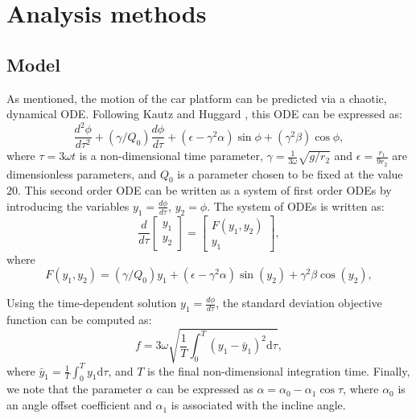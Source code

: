 \documentclass[11pt]{article}
\begin{document}
\section{Analysis methods}

\subsection{Model}

As mentioned, the motion of the car platform can be
predicted via a chaotic, dynamical ODE. Following
Kautz and Huggard \cite{chaos}, this ODE can be
expressed as:
%
\begin{equation}
\frac{d^2 \phi}{d \tau^2} +
(\gamma / Q_0) \frac{d \phi} {d \tau} +
(\epsilon - \gamma^2 \alpha) \sin \phi +
(\gamma^2 \beta) \cos \phi,
\end{equation}
%
where $\tau = 3 \omega t$ is a non-dimensional time
parameter, $\gamma = \frac{1}{3 \omega} \sqrt{g/r_2}$
and $\epsilon = \frac{r_1}{9 r_2}$ are dimensionless
parameters, and $Q_0$ is a parameter chosen to be fixed
at the value $20$. This second order ODE can be written
as a system of first order ODEs by introducing the
variables $y_1 = \frac{d \phi}{d \tau}$, $y_2 = \phi$.
The system of ODEs is written as:
%
\begin{equation}
\frac{d}{d \tau}
\begin{bmatrix}
y_1\\
y_2
\end{bmatrix}
=
\begin{bmatrix}
F(y_1, y_2) \\
y_1
\end{bmatrix},
\end{equation}
%
where
%
\begin{equation}
F(y_1, y_2) =
(\gamma / Q_0) y_1 +
(\epsilon - \gamma^2 \alpha) \sin (y_2) +
\gamma^2 \beta \cos(y_2),
\end{equation}

Using the time-dependent solution
$y_1 = \frac{d \phi} {d \tau}$,
the standard deviation objective function can be
computed as:
%
\begin{equation}
f = 3 \omega
\sqrt{ \frac{1}{T} \int_0^T (y_1 - \bar{y}_1)^2 \text{d} \tau},
\label{eq:obj}
\end{equation}
%
where $\bar{y}_1 = \frac{1}{T} \int_0^T y_1 \text{d} \tau$,
and $T$ is the final non-dimensional integration time.
Finally, we note that the parameter $\alpha$ can be
expressed as $\alpha = \alpha_0 - \alpha_1 \cos \tau$,
where $\alpha_0$ is an angle offset coefficient
and $\alpha_1$ is associated with the incline angle.
\end{document}
